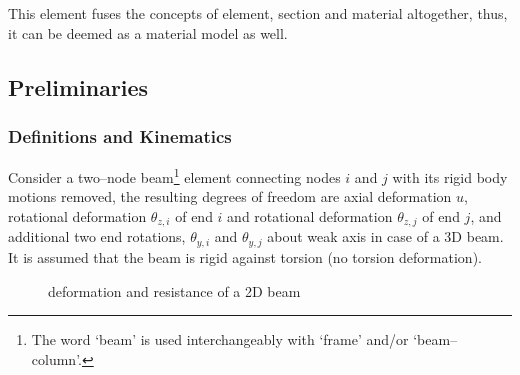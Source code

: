 This element fuses the concepts of element, section and material altogether, thus, it can be deemed as a material model as well.
\subsection{Preliminaries}
\subsubsection{Definitions and Kinematics}
Consider a two--node beam\footnote{The word `beam' is used interchangeably with `frame' and/or `beam--column'.} element connecting nodes $i$ and $j$ with its rigid body motions removed, the resulting degrees of freedom are axial deformation $u$, rotational deformation $\theta_{z,i}$ of end $i$ and rotational deformation $\theta_{z,j}$ of end $j$, and additional two end rotations, $\theta_{y,i}$ and $\theta_{y,j}$ about weak axis in case of a 3D beam.
It is assumed that the beam is rigid against torsion (no torsion deformation).
\begin{figure}[H]
\centering
{}
\caption{deformation and resistance of a 2D beam}
\end{figure}

